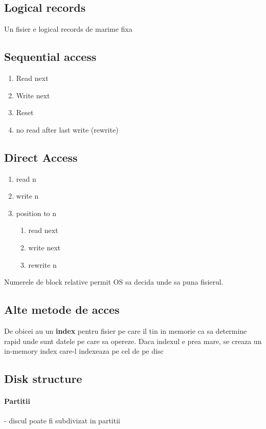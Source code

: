 \documentclass{article}
\begin{document}
\subsection*{Logical records}
Un fisier e logical records de marime fixa

\subsection*{Sequential access}
\begin{enumerate}
    \item Read next
    \item Write next
    \item Reset
    \item no read after last write (rewrite)
\end{enumerate}

\subsection*{Direct Access}
\begin{enumerate}
    \item read n
    \item write n
    \item position to n
          \begin{enumerate}
              \item read next
              \item write next
              \item rewrite n
          \end{enumerate}
\end{enumerate}

Numerele de block relative permit OS sa decida unde sa puna fisierul.

\subsection*{Alte metode de acces}
De obicei au un \textbf{index} pentru fisier pe care il tin in memorie ca sa determine rapid unde sunt datele pe care sa opereze. Daca indexul e prea mare, se creaza un in-memory index care-l indexeaza pe cel de pe disc

\subsection*{Disk structure}
\paragraph*{Partitii} - discul poate fi subdivizat in partitii
\end{document}
